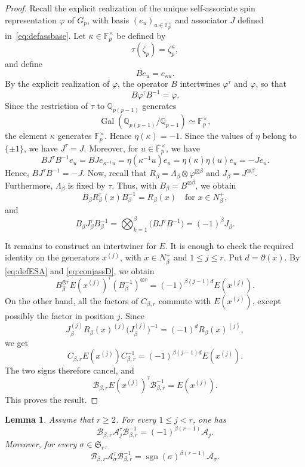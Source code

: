 \documentclass[reqno]{amsart}
\DeclareMathOperator{\sgn}{sgn}
\DeclareMathOperator{\Gal}{Gal}
\newcommand{\sym}{\mathfrak{S}}
\newcommand{\Q}{\mathbb{Q}}
\newtheorem{lemma}[theorem]{Lemma}     %
\theoremstyle{definition}
\begin{document}
\begin{proof}
Recall the explicit realization of the unique self-associate spin
representation $\varphi$ of $G_p$, with basis
$(e_u)_{u\in\mathbb F_p^\times}$ and associator $J$ defined
in~\eqref{eq:defassbase}. Let $\kappa\in\mathbb F_p^\times$ be defined by
\[
\tau(\zeta_p)=\zeta_p^\kappa,
\]
and define
\[
Be_u=e_{\kappa u}.
\]
By the explicit realization of $\varphi$, the operator $B$ intertwines
$\varphi^\tau$ and $\varphi$, so that
\[
B\varphi^\tau B^{-1}=\varphi.
\]
Since the restriction of $\tau$ to $\Q_{p(p-1)}$ generates
\[
\Gal(\Q_{p(p-1)}/\Q_{p-1})
\simeq\mathbb F_p^\times,
\]
the element $\kappa$ generates $\mathbb F_p^\times$. Hence
$\eta(\kappa)=-1$.
Since the values of $\eta$ belong to $\{\pm1\}$, we have $J^\tau=J$.
Moreover, for $u\in\mathbb F_p^\times$, we have
\[
BJ^\tau B^{-1}e_u
=
BJ e_{\kappa^{-1}u}
=
\eta(\kappa^{-1}u)e_u
=
\eta(\kappa)\eta(u)e_u
=
-Je_u.
\]
Hence,
$
BJ^\tau B^{-1}=-J$.
Now, recall that
$
R_\beta=\Lambda_\beta\otimes\varphi^{\boxtimes\beta}$
and 
$J_\beta=J^{\otimes\beta}$. Furthermore, 
$\Lambda_\beta$ is fixed by $\tau$. Thus, with
$
B_\beta=B^{\otimes\beta}$,
we obtain
\[
B_\beta R_\beta^\tau(x)B_\beta^{-1}
=
R_\beta(x)
\quad
\text{for }x\in N_\beta^+,
\]
and
\[
B_\beta J_\beta^\tau B_\beta^{-1}
=
\bigotimes_{k=1}^\beta
\bigl(BJ^\tau B^{-1}\bigr)
=
(-1)^\beta J_\beta.
\]

It remains to construct an intertwiner for $E$. It is enough to check
the required identity on the generators $x^{(j)}$, with
$x\in N_\beta^+$ and $1\leq j\leq r$. Put $d=\partial(x)$. By
\eqref{eq:defESA} and \eqref{eq:conjassD}, we obtain
\[
B_\beta^{\otimes r}
E(x^{(j)})^\tau
(B_\beta^{-1})^{\otimes r}
=
(-1)^{\beta(j-1)d}E(x^{(j)}).
\]
On the other hand, all the factors of $C_{\beta,r}$ commute with
$E(x^{(j)})$, except possibly the factor in position $j$. Since
\[
J_\beta^{(j)}
R_\beta(x)^{(j)}
\bigl(J_\beta^{(j)}\bigr)^{-1}
=
(-1)^dR_\beta(x)^{(j)},
\]
we get
\[
C_{\beta,r}E(x^{(j)})C_{\beta,r}^{-1}
=
(-1)^{\beta(j-1)d}E(x^{(j)}).
\]
The two signs therefore cancel, and
\[
\mathcal B_{\beta,r}
E(x^{(j)})^\tau
\mathcal B_{\beta,r}^{-1}
=
E(x^{(j)}).
\]
This proves the result.
\end{proof}


\begin{lemma}
\label{lem:galois-A}
Assume that $r\geq2$. For every $1\leq j<r$, one has
\[
\mathcal B_{\beta,r}\mathcal A_j^\tau
\mathcal B_{\beta,r}^{-1}
=
(-1)^{\beta(r-1)}\mathcal A_j.
\]
Moreover, for every $\sigma\in\sym_r$,
\begin{equation}
\label{eq:intergal}
\mathcal B_{\beta,r}\mathcal A_\sigma^\tau
\mathcal B_{\beta,r}^{-1}
=
\sgn(\sigma)^{\beta(r-1)}\mathcal A_\sigma.
\end{equation}
\end{lemma}
\end{document}
